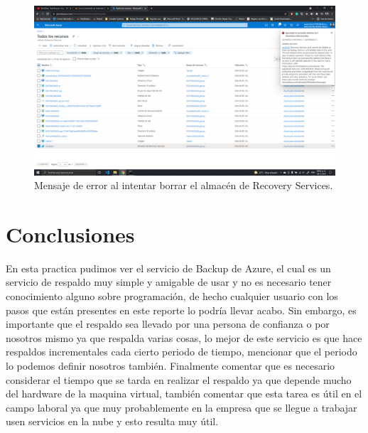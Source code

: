 \documentclass[11pt]{article}
\begin{document}
		\begin{figure}[H]
			\centering
			\includegraphics[scale=0.34]{resources/4.9error.png}
			\caption{Mensaje de error al intentar borrar el almacén de Recovery Services.}\label{fig:picture}
		\end{figure}
	\section{Conclusiones}
	En esta practica pudimos ver el servicio de Backup de Azure, el cual es un servicio de respaldo muy simple y amigable de usar y no es necesario tener conocimiento alguno sobre programación, de hecho cualquier usuario con los pasos que están presentes en este reporte lo podría llevar acabo. Sin embargo, es importante que el respaldo sea llevado por una persona de confianza o por nosotros mismo ya que respalda varias cosas, lo mejor de este servicio es que hace respaldos incrementales cada cierto periodo de tiempo, mencionar que el periodo lo podemos definir nosotros también. Finalmente comentar que es necesario considerar el tiempo que se tarda en realizar el respaldo ya que depende mucho del hardware de la maquina virtual, también comentar que esta tarea es útil en el campo laboral ya que muy probablemente en la empresa que se llegue a trabajar usen servicios en la nube y esto resulta muy útil.
		
\end{document}
